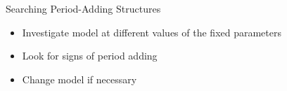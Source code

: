 %
%
%

\begin{frame}{Searching Period-Adding Structures}
    \begin{itemize}
        \item Investigate model at different values of the fixed parameters
        \item Look for signs of period adding
        \item Change model if necessary
    \end{itemize}
\end{frame}